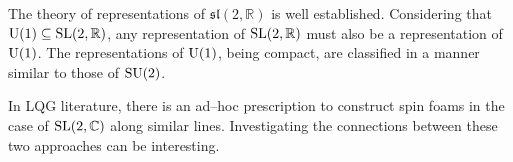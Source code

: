 The theory of representations of \(\mathfrak{sl}(2,\mathbb{R})\) is well established. Considering that \(\text{\normalfont U}(1) \subseteq \text{\normalfont SL}(2,\mathbb{R})\), any representation of \(\text{\normalfont SL}(2,\mathbb{R})\) must also be a representation of \(\text{\normalfont U}(1)\). The representations of \(\text{\normalfont U}(1)\), being compact, are classified in a manner similar to those of \(\text{\normalfont SU}(2)\).

In LQG literature, there is an ad--hoc prescription to construct spin foams in the case of \(\text{\normalfont SL}(2,\mathbb{C})\) along similar lines. Investigating the connections between these two approaches can be interesting.







